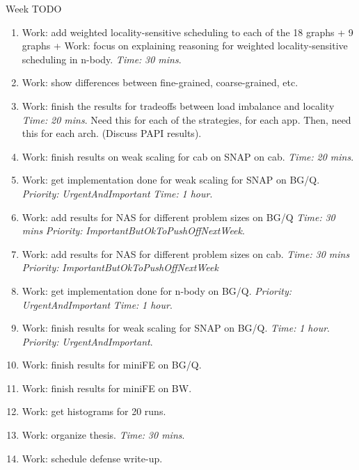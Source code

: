 \documentclass[serif, mathserif, final]{beamer}
\newcommand{\timeEst}[1]{\textit{Time:} \textit{#1}}
\newcommand{\priority}[1]{\textit{Priority:} \textit{#1}}
\begin{document}
\begin{frame}{}
\begin{columns}
\begin{column}{0.50\linewidth}
\begin{block}{Week TODO}
\begin{enumerate}
    \item \tiny Work: add weighted locality-sensitive scheduling to
      each of the 18 graphs + 9 graphs + Work: focus on explaining
      reasoning for weighted locality-sensitive scheduling in n-body. 
      \timeEst{30 mins}. 

    \item \tiny Work: show differences between fine-grained,
      coarse-grained, etc. 

    \item \tiny Work: finish the results for tradeoffs between load
      imbalance and locality \timeEst{20 mins}. Need this for each of
      the strategies, for each app. Then, need this for each arch.
      (Discuss PAPI results). 

    \item \tiny Work: finish results on weak scaling for cab on SNAP on cab. \timeEst{20 mins}.

    \item \tiny Work: get implementation done for weak scaling for 
      SNAP on BG/Q. \priority{UrgentAndImportant} \timeEst{1 hour}.       

    \item \tiny Work: add results for NAS for different problem sizes
      on BG/Q  \timeEst{30 mins } \priority{ImportantButOkToPushOffNextWeek}.

    \item \tiny Work: add results for NAS for different problem sizes
      on cab. \timeEst{30 mins } \priority{ImportantButOkToPushOffNextWeek} 

    \item \tiny Work: get implementation done for
      n-body on BG/Q. \priority{UrgentAndImportant} \timeEst{1 hour}.       

    \item \tiny Work: finish results for weak scaling for SNAP on
      BG/Q. \timeEst{1 hour}. \priority{UrgentAndImportant}. 

    \item \tiny Work: finish results for miniFE on BG/Q. 
    \item \tiny Work: finish results for miniFE on BW.         
    \item \tiny Work: get histograms for 20 runs. 

    \item \tiny Work: organize thesis. \timeEst{30 mins}.   
    \item \tiny Work: schedule defense write-up. 


\end{enumerate}
\end{block}
\end{column}
\end{columns}
\end{frame}
\end{document}
